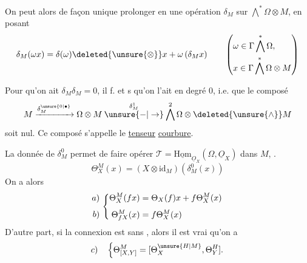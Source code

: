 On peut alors de façon unique prolonger en une  opération $\delta_M$ sur $\bigwedge^*\Omega\otimes M$, en posant
\[
\delta_M(\omega x)=\delta(\omega)\deleted{\unsure{\otimes}}x+\omega\,(\delta_M x)
\qquad\left(\begin{aligned}
&\omega\in\Gamma\bigwedge^*\Omega,\\
&x\in\Gamma\bigwedge^*\Omega\otimes M
\end{aligned}\right)
\]

Pour qu'on ait $\delta_M\delta_M=0$, il f. et s qu'on l'ait  en degré 0, i.e. que le composé
\[
M\xrightarrow{\delta_M^{\unsure{0|\bullet}}}\Omega\otimes M
\overset{\delta_M^1}{\mathbin{\unsure{-|\to}}}\bigwedge^2\Omega\otimes\deleted{\unsure{\wedge}} M
\]
soit nul. Ce composé s'appelle le \uline{tenseur} \uline{courbure}.

La donnée de  $\delta_M^0$ permet de faire opérer $\mathscr T=\underline{\mathrm{Hom}}_{\underline O_X}(\Omega,\underline O_X)$ dans $M$, .
\[
\Theta_X^M(x)=(X\otimes\mathrm{id}_M)(\delta_M^0(x))
\]
On a alors
\[
\begin{array}{r@{\ }l}
\begin{aligned}a)\\[1ex] b)\end{aligned}&
\left\{\begin{aligned}
\Theta_X^M(fx)&=\Theta_X(f)x+f\Theta_X^M(x)\\[1ex]
\Theta_{fX}^M(x)&=f\Theta_X^M(x)
\end{aligned}\right.
\end{array}
\]
D'autre part, si la connexion est sans , alors il est vrai qu'on a
\[
c)\quad\left\{\Theta^M_{[X,Y]}=[\Theta_X^{\unsure{H|M}},\Theta_Y^{H}].\right.
\]


